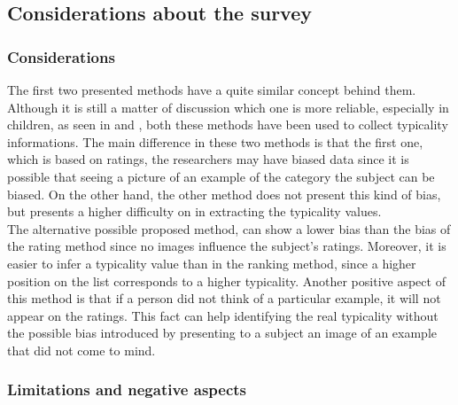 \documentclass[conference]{IEEEtran}
\begin{document}
		\subsection{Considerations about the survey\label{sec:cas}}
		
			\subsubsection{Considerations}
				\noindent The first two presented methods have a quite similar concept behind them. Although it is still a matter of discussion which one is more reliable, especially in children, as seen in \cite{maridaki1997rating} 
				and \cite{10.1371/journal.pone.0157936}, both these methods have been used to collect typicality informations. The main difference in these two methods is that the first one, which is based on 
				ratings, the researchers may have biased data since it is possible that seeing a picture of an example of the category the subject can be biased. On the other hand, the other method does not present 
				this kind of bias, but presents a higher difficulty on in extracting the typicality values. \\
				The alternative possible proposed method, can show a lower bias than the bias of the rating method since no images influence the subject's ratings. Moreover, it is easier to infer a typicality value 
				than in the ranking method, since a higher position on the list corresponds to a higher typicality. 
				Another positive aspect of this method is that if a person did not think of a particular example, it will not appear on the ratings. This fact can help identifying the real typicality 
				without the possible bias introduced by presenting to a subject an image of an example that did not come to mind. 

			\subsubsection{Limitations and negative aspects}
			
\end{document}
